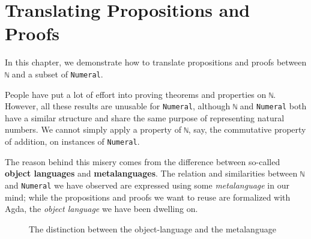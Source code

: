 \documentclass[\main/thesis.tex]{subfiles}
\begin{document}
\chapter{Translating Propositions and Proofs}\label{translation}

In this chapter, we demonstrate how to translate propositions and proofs between
\lstinline|ℕ| and a subset of \lstinline|Numeral|.

People have put a lot of effort into proving theorems and properties on
\lstinline|ℕ|.
However, all these results are unusable for \lstinline|Numeral|,
although \lstinline|ℕ| and \lstinline|Numeral| both have a similar structure and
share the same purpose of representing natural numbers.
We cannot simply apply a property of \lstinline|ℕ|, say,
the commutative property of addition, on instances of \lstinline|Numeral|.

The reason behind this misery comes from the difference between so-called
\textbf{object languages} and \textbf{metalanguages}.
The relation and similarities between \lstinline|ℕ| and \lstinline|Numeral|
we have observed are expressed using some \textit{metalanguage} in our mind;
while the propositions and proofs we want to reuse are formalized with Agda,
the \textit{object language} we have been dwelling on.

\begin{figure}[H]
    \centering
    \begin{adjustbox}{max width=\textwidth}
    \end{adjustbox}
\caption{The distinction between the object-language and the metalanguage}
\label{figure:37}
\end{figure}
\end{document}
